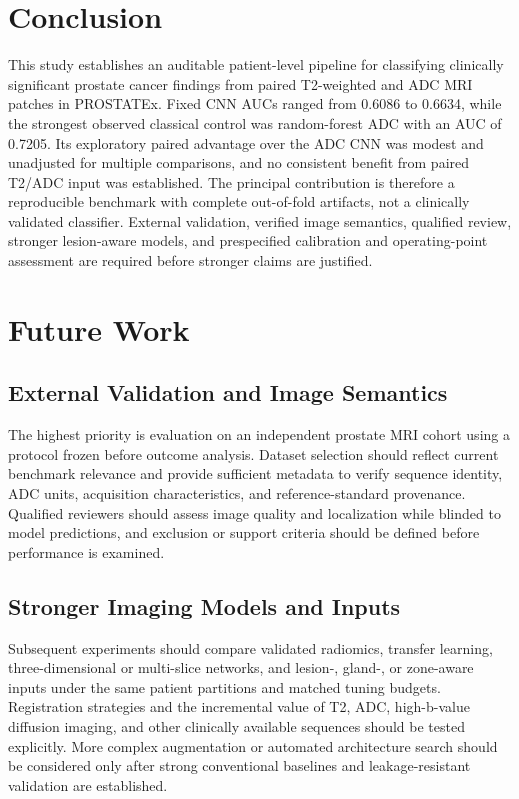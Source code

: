 \documentclass[11pt]{article}
\begin{document}
\section{Conclusion}\label{sec:6}

This study establishes an auditable patient-level pipeline for classifying clinically significant prostate cancer findings from paired T2-weighted and ADC MRI patches in PROSTATEx. Fixed CNN AUCs ranged from 0.6086 to 0.6634, while the strongest observed classical control was random-forest ADC with an AUC of 0.7205. Its exploratory paired advantage over the ADC CNN was modest and unadjusted for multiple comparisons, and no consistent benefit from paired T2/ADC input was established. The principal contribution is therefore a reproducible benchmark with complete out-of-fold artifacts, not a clinically validated classifier. External validation, verified image semantics, qualified review, stronger lesion-aware models, and prespecified calibration and operating-point assessment are required before stronger claims are justified.

\section{Future Work}\label{sec:7}

\subsection{External Validation and Image Semantics}\label{sec:7.1}

The highest priority is evaluation on an independent prostate MRI cohort using a protocol frozen before outcome analysis. Dataset selection should reflect current benchmark relevance and provide sufficient metadata to verify sequence identity, ADC units, acquisition characteristics, and reference-standard provenance. Qualified reviewers should assess image quality and localization while blinded to model predictions, and exclusion or support criteria should be defined before performance is examined.

\subsection{Stronger Imaging Models and Inputs}\label{sec:7.2}

Subsequent experiments should compare validated radiomics, transfer learning, three-dimensional or multi-slice networks, and lesion-, gland-, or zone-aware inputs under the same patient partitions and matched tuning budgets. Registration strategies and the incremental value of T2, ADC, high-b-value diffusion imaging, and other clinically available sequences should be tested explicitly. More complex augmentation or automated architecture search should be considered only after strong conventional baselines and leakage-resistant validation are established.
\end{document}

